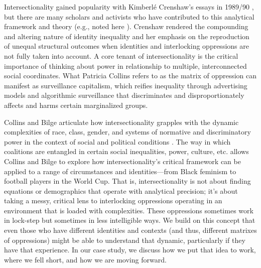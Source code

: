 \documentclass[11pt,dvipdfm]{article}
\begin{document}
Intersectionality gained popularity with Kimberlé Crenshaw’s essays in 1989/90 \cite{13,14}, but there are many scholars and activists who have contributed to this analytical framework and theory (e.g., noted here \cite{47}). Crenshaw rendered the compounding and altering nature of identity inequality and her emphasis on the reproduction of unequal structural outcomes when identities and interlocking oppressions are not fully taken into account. A core tenant of intersectionality is the critical importance of thinking about power in relationship to multiple, interconnected social coordinates. What Patricia Collins refers to as the matrix of oppression \cite{7} can manifest as surveillance capitalism, which reifies inequality through advertising models and algorithmic surveillance that discriminates and disproportionately affects and harms certain marginalized groups. 

Collins and Bilge articulate how intersectionality grapples with the dynamic complexities of race, class, gender, and systems of normative and discriminatory power in the context of social and political conditions \cite{8}. The way in which coalitions are entangled in certain social inequalities, power, culture, etc. allows Collins and Bilge to explore how intersectionality’s critical framework can be applied to a range of circumstances and identities—from Black feminism to football players in the World Cup. That is, intersectionality is not about finding equations or demographics that operate with analytical precision; it’s about taking a messy, critical lens to interlocking oppressions operating in an environment that is loaded with complexities. These oppressions sometimes work in lock-step but sometimes in less intelligible ways. We build on this concept that even those who have different identities and contexts (and thus, different matrixes of oppressions) might be able to understand that dynamic, particularly if they have that experience. In our case study, we discuss how we put that idea to work, where we fell short, and how we are moving forward. 
\end{document}

